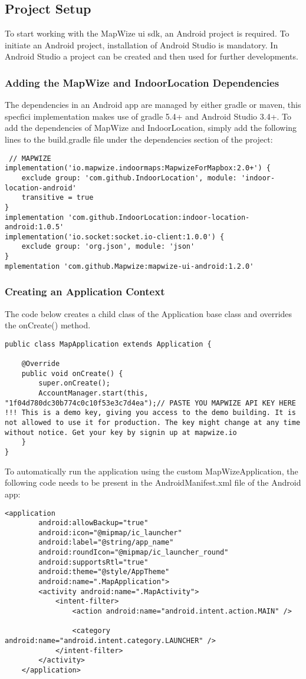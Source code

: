\subsection{Project Setup}
To start working with the MapWize \acrshort{ui} \acrshort{sdk}, an Android project is required. To initiate an Android project, installation of Android Studio is mandatory. In Android Studio a project can be created and then used for further developments.
\subsubsection{Adding the MapWize and IndoorLocation Dependencies}
The dependencies in an Android \acrshort{app} are managed by either gradle or maven, this specfici implementation makes use of gradle 5.4+ and Android Studio 3.4+. To add the dependencies of MapWize and IndoorLocation, simply add the following lines to the build.gradle file under the dependencies section of the project:
\begin{verbatim}
 // MAPWIZE
implementation('io.mapwize.indoormaps:MapwizeForMapbox:2.0+') {
	exclude group: 'com.github.IndoorLocation', module: 'indoor-location-android'
	transitive = true
}
implementation 'com.github.IndoorLocation:indoor-location-android:1.0.5'
implementation('io.socket:socket.io-client:1.0.0') {
	exclude group: 'org.json', module: 'json'
}
mplementation 'com.github.Mapwize:mapwize-ui-android:1.2.0'
\end{verbatim}
\subsubsection{Creating an Application Context}
The code below creates a child class of the Application base class and overrides the onCreate() method.
\begin{verbatim}
public class MapApplication extends Application {

    @Override
    public void onCreate() {
        super.onCreate();
        AccountManager.start(this, "1f04d780dc30b774c0c10f53e3c7d4ea");// PASTE YOU MAPWIZE API KEY HERE !!! This is a demo key, giving you access to the demo building. It is not allowed to use it for production. The key might change at any time without notice. Get your key by signin up at mapwize.io
    }
}
\end{verbatim}
To automatically run the application using the custom MapWizeApplication, the following code needs to be present in the AndroidManifest.xml file of the Android \acrshort{app}:
\begin{verbatim}
<application
        android:allowBackup="true"
        android:icon="@mipmap/ic_launcher"
        android:label="@string/app_name"
        android:roundIcon="@mipmap/ic_launcher_round"
        android:supportsRtl="true"
        android:theme="@style/AppTheme"
        android:name=".MapApplication">
        <activity android:name=".MapActivity">
            <intent-filter>
                <action android:name="android.intent.action.MAIN" />

                <category android:name="android.intent.category.LAUNCHER" />
            </intent-filter>
        </activity>
    </application>
\end{verbatim}
